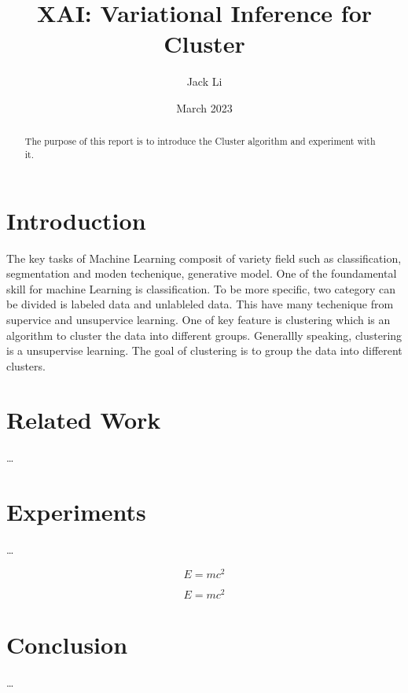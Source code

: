 \documentclass[a4paper,12pt]{article}
\title{XAI: Variational Inference for Cluster}
\author{Jack Li}
\date{March 2023}
\begin{document}
\maketitle

\begin{abstract}
The purpose of this report is to introduce the Cluster algorithm and experiment with it.
\end{abstract}

\section{Introduction}
The key tasks of Machine Learning composit of variety field such as classification, segmentation and moden techenique, generative model.  
One of the foundamental skill for machine Learning is classification. To be more specific, two category can be divided is labeled data and unlableled data. 
This have many techenique from supervice and unsupervice learning. One of key feature is clustering which is an algorithm to cluster the data into different groups.
Generallly speaking, clustering is a unsupervise learning. The goal of clustering is to group the data into different clusters. 




\section{Related Work}
\ldots

\section{Experiments}
\ldots

$$
E = mc^2
$$

\[
E = mc^2
\]
\section{Conclusion}
\ldots
\end{document}
